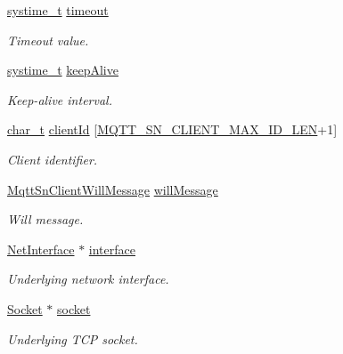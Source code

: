 \begin{DoxyCompactItemize}
\hyperlink{compiler__port_8h_ae3e32a98d431a02106616da3071832dd}{systime\+\_\+t} \hyperlink{struct__MqttSnClientContext_a50420f8ba7729f44240ed89dba3354c0}{timeout}
\begin{DoxyCompactList}\small\item\em Timeout value. \end{DoxyCompactList}\item 
\hyperlink{compiler__port_8h_ae3e32a98d431a02106616da3071832dd}{systime\+\_\+t} \hyperlink{struct__MqttSnClientContext_ac311111a3fd41085052f54e80c56c1a2}{keep\+Alive}
\begin{DoxyCompactList}\small\item\em Keep-\/alive interval. \end{DoxyCompactList}\item 
\hyperlink{compiler__port_8h_a40bb5262bf908c328fbcfbe5d29d0201}{char\+\_\+t} \hyperlink{struct__MqttSnClientContext_a651887eae60b024cda3699b46f1efb38}{client\+Id} \mbox{[}\hyperlink{mqtt__sn__client_8h_a8903ddd9dd0e6d56d19a16aa63381389}{M\+Q\+T\+T\+\_\+\+S\+N\+\_\+\+C\+L\+I\+E\+N\+T\+\_\+\+M\+A\+X\+\_\+\+I\+D\+\_\+\+L\+EN}+1\mbox{]}
\begin{DoxyCompactList}\small\item\em Client identifier. \end{DoxyCompactList}\item 
\hyperlink{structMqttSnClientWillMessage}{Mqtt\+Sn\+Client\+Will\+Message} \hyperlink{struct__MqttSnClientContext_a909d86ca0f5676a1d056c3af9c2d0aed}{will\+Message}
\begin{DoxyCompactList}\small\item\em Will message. \end{DoxyCompactList}\item 
\hyperlink{net_8h_a2234db8911a1148c9159979d8f5e0d6b}{Net\+Interface} $\ast$ \hyperlink{struct__MqttSnClientContext_a9da3d73c59c11543ede2342d10fb37c0}{interface}
\begin{DoxyCompactList}\small\item\em Underlying network interface. \end{DoxyCompactList}\item 
\hyperlink{socket_8h_aa85acfb0fa336ef495e6ba87fb88fc48}{Socket} $\ast$ \hyperlink{struct__MqttSnClientContext_aca3e0fe4fc5f89fb2bb9fc7285491597}{socket}
\begin{DoxyCompactList}\small\item\em Underlying T\+CP socket. \end{DoxyCompactList}\item 

\end{DoxyCompactItemize}
